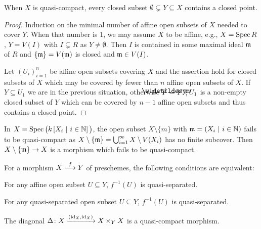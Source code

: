 \documentclass[a4paper,parskip=half,numbers=enddot, DIV=12]{scrreprt}
\begin{document}
\begin{prop}
    When $X$ is quasi-compact, every closed subset $\emptyset\subsetneq Y\subseteq X$ contains a closed point.
\end{prop}
\begin{proof}
    Induction on the minimal number of affine open subsets of $X$ needed to cover $Y$. When that number is $1$, we may assume $X$ to be affine, e.g., $X= \operatorname{Spec} R$, $Y=V(I)$ with $I\subsetneq R$ as $Y\neq\emptyset$. Then $I$ is contained in some maximal ideal $\mathfrak{m}$ of $R$ and $\{\mathfrak{m}\} = V(\mathfrak{m})$ is closed and $\mathfrak{m}\in V(I)$.
    
    Let $(U_i)_{i=1}^n$ be affine open subsets covering $X$ and the assertion hold for closed subsets of $X$ which may be covered by fewer than $n$ affine open subsets of $X$. If $Y\subseteq U_1$ we are in the previous situation, otherwise $\snake Y = Y\setminus U_1$ is a non-empty closed subset of $Y$ which can be covered by $n-1$ affine open subsets and thus contains a closed point.
\end{proof}
\begin{example}
    In $X=\operatorname{Spec} \big(k\left[X_i \ \middle|\  i\in \mathbb{N}\right]\big)$, the open subset $X\setminus \{m\}$ with $\mathfrak{m}= \left( X_i\ \middle|\  i\in\mathbb{N} \right)$ fails to be quasi-compact as $X\setminus \{\mathfrak{m}\} = \bigcup_{i=1}^\infty X\setminus V(X_i)$ has no finite subcover. Then $X\setminus \{\mm\}\morphism X$ is a morphism which fails to be quasi-compact.
\end{example}
\begin{lem}
    For a morphism $X\morphism[f] Y$ of preschemes, the following conditions are equivalent:
    \begin{alphanumerate}
    \item 
        For any affine open subset $U\subseteq Y$, $f^{-1}(U)$ is quasi-separated.
    \item 
        For any quasi-separated open subset $U\subseteq Y$, $f^{-1}(U)$ is quasi-separated.
    \item 
        The diagonal $\Delta\colon X \xrightarrow{(\operatorname{id}_X,\operatorname{id}_X)} X\times_Y X$ is a quasi-compact morphism.
    \end{alphanumerate}
\end{lem}
\end{document}

